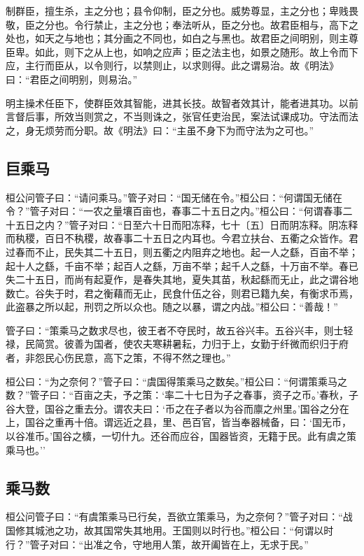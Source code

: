 \documentclass[]{article}
\begin{document}
制群臣，擅生杀，主之分也；县令仰制，臣之分也。威势尊显，主之分也；卑贱畏敬，臣之分也。令行禁止，主之分也；奉法听从，臣之分也。故君臣相与，高下之处也，如天之与地也；其分画之不同也，如白之与黑也。故君臣之间明别，则主尊臣卑。如此，则下之从上也，如响之应声；臣之法主也，如景之随形。故上令而下应，主行而臣从，以令则行，以禁则止，以求则得。此之谓易治。故《明法》曰：``君臣之间明别，则易治。''

明主操术任臣下，使群臣效其智能，进其长技。故智者效其计，能者进其功。以前言督后事，所效当则赏之，不当则诛之，张官任吏治民，案法试课成功。守法而法之，身无烦劳而分职。故《明法》曰：``主虽不身下为而守法为之可也。''

\hypertarget{header-n949}{%
\subsection{巨乘马}\label{header-n949}}

桓公问管子曰：``请问乘马。''管子对曰：``国无储在令。''桓公曰：``何谓国无储在令？''管子对曰：``一农之量壤百亩也，春事二十五日之内。''桓公曰：``何谓春事二十五日之内？''管子对曰：``日至六十日而阳冻释，七十〔五〕日而阴冻释。阴冻释而秇稷，百日不秇稷，故春事二十五日之内耳也。今君立扶台、五衢之众皆作。君过春而不止，民失其二十五日，则五衢之内阻弃之地也。起一人之繇，百亩不举；起十人之繇，千亩不举；起百人之繇，万亩不举；起千人之繇，十万亩不举。春已失二十五日，而尚有起夏作，是春失其地，夏失其苗，秋起繇而无止，此之谓谷地数亡。谷失于时，君之衡藉而无止，民食什伍之谷，则君已籍九矣，有衡求币焉，此盗暴之所以起，刑罚之所以众也。随之以暴，谓之内战。''桓公曰：``善哉！''

管子曰：``策乘马之数求尽也，彼王者不夺民时，故五谷兴丰。五谷兴丰，则士轻禄，民简赏。彼善为国者，使农夫寒耕暑耘，力归于上，女勤于纤微而织归于府者，非怨民心伤民意，高下之策，不得不然之理也。''

桓公曰：``为之奈何？''管子曰：``虞国得策乘马之数矣。''桓公曰：``何谓策乘马之数？''管子曰：``百亩之夫，予之策：`率二十七日为子之春事，资子之币。'春秋，子谷大登，国谷之重去分。谓农夫曰：`币之在子者以为谷而廪之州里。'国谷之分在上，国谷之重再十倍。谓远近之县，里、邑百官，皆当奉器械备，曰：`国无币，以谷准币。'国谷之櫎，一切什九。还谷而应谷，国器皆资，无籍于民。此有虞之策乘马也。''

\hypertarget{header-n955}{%
\subsection{乘马数}\label{header-n955}}

桓公问管子曰：``有虞策乘马已行矣，吾欲立策乘马，为之奈何？''管子对曰：``战国修其城池之功，故其国常失其地用。王国则以时行也。''桓公曰：``何谓以时行？''管子对曰：``出准之令，守地用人策，故开阖皆在上，无求于民。''
\end{document}
